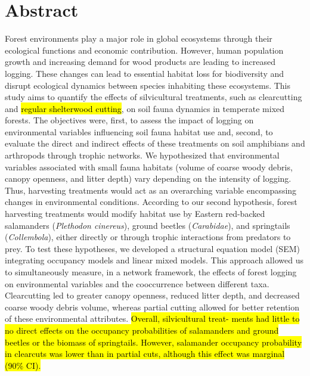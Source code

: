 \chapter*{Abstract}             %
\label{chap-abstract}           %

Forest environments play a major role in global ecosystems through their ecological functions and economic contribution. 
However, human population growth and increasing demand for wood products are leading to increased logging. 
These changes can lead to essential habitat loss for biodiversity and disrupt ecological dynamics between species inhabiting these ecosystems. 
This study aims to quantify the effects of silvicultural treatments, such as clearcutting and \hl{regular shelterwood cutting}, on soil fauna dynamics in temperate mixed forests. 
The objectives were, first, to assess the impact of logging on environmental variables influencing soil fauna habitat use and, second, 
to evaluate the direct and indirect effects of these treatments on soil amphibians and arthropods through trophic networks. 
We hypothesized that environmental variables associated with small fauna habitats (volume of coarse woody debris, canopy openness, and litter depth) vary depending on the intensity of logging. 
Thus, harvesting treatments would act as an overarching variable encompassing changes in environmental conditions. 
According to our second hypothesis, forest harvesting treatments would modify habitat use by Eastern red-backed salamanders (\textit{Plethodon cinereus}), ground beetles (\textit{Carabidae}), and springtails (\textit{Collembola}), 
either directly or through trophic interactions from predators to prey. 
To test these hypotheses, we developed a structural equation model (SEM) integrating occupancy models and linear mixed models. 
This approach allowed us to simultaneously measure, in a network framework, the effects of forest logging on environmental variables and the cooccurrence between different taxa. 
Clearcutting led to greater canopy openness, reduced litter depth, and decreased coarse woody debris volume,  
whereas partial cutting allowed for better retention of these environmental attributes. 
\hl{Overall, silvicultural treat- ments had little to no direct effects on the occupancy probabilities of salamanders and ground beetles or the biomass of springtails. 
However, salamander occupancy probability in clearcuts was lower than in partial cuts, although this effect was marginal (90\% CI).}
